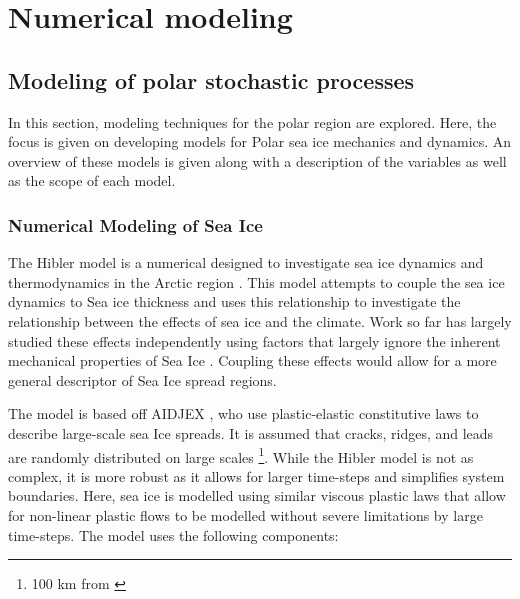 \appendix

\chapter{Numerical modeling}

\section{Modeling of polar stochastic processes}
\label{app:modelling}
In this section, modeling techniques for the polar region are explored. Here, the focus is given on developing models for Polar sea ice mechanics and dynamics. An overview of these models is given along with a description of the variables as well as the scope of each model.

\subsection{Numerical Modeling of Sea Ice}

The Hibler model is a numerical designed to investigate sea ice dynamics and thermodynamics in the Arctic region \cite{hibler1979dynamic}. This model attempts to couple the sea ice dynamics to Sea ice thickness and uses this relationship to investigate the relationship between the effects of sea ice and the climate. Work so far has largely studied these effects independently using factors that largely ignore the inherent mechanical properties of Sea Ice \cite{hibler1979dynamic}. Coupling these effects would allow for a more general descriptor of Sea Ice spread regions.\par

The model is based off \textcite{coon1974modeling} AIDJEX \cite{hibler1979dynamic}, who use plastic-elastic constitutive laws to describe large-scale sea Ice spreads. It is assumed that cracks, ridges, and leads are randomly distributed on large scales \footnote{100 km from \textcite{coon2007arctic}}. While the Hibler model is not as complex, it is more robust as it allows for larger time-steps and simplifies system boundaries. Here, sea ice is modelled using similar viscous plastic laws \cite{hibler1979dynamic} that allow for non-linear plastic flows to be modelled without severe limitations by large time-steps. The model uses the following components:

